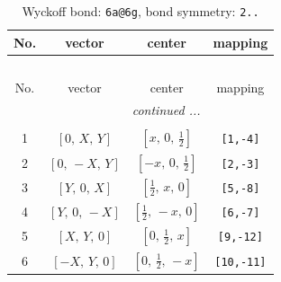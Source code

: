 \documentclass[fleqn,8pt]{jsarticle}
\begin{document}
\begin{longtable}{cccc}
\caption{Wyckoff bond: {\tt 6a@6g}, bond symmetry: {\tt 2..}}
 \\
 \hline \hline
No. & vector & center & mapping \\ \hline \endfirsthead

\multicolumn{3}{l}{\tablename\ \thetable{}} \\
 \hline \hline
No. & vector & center & mapping \\ \hline \endhead

 \hline \hline
\multicolumn{3}{r}{\footnotesize\it continued ...} \\ \endfoot

 \hline \hline
\multicolumn{3}{r}{} \\ \endlastfoot

1 & $\left[ 0,\, X,\, Y \right]$ & $\left[ x,\, 0,\, \frac{1}{2} \right]$ & {\tt [1,-4]} \\ \hline
2 & $\left[ 0,\, - X,\, Y \right]$ & $\left[ - x,\, 0,\, \frac{1}{2} \right]$ & {\tt [2,-3]} \\ \hline
3 & $\left[ Y,\, 0,\, X \right]$ & $\left[ \frac{1}{2},\, x,\, 0 \right]$ & {\tt [5,-8]} \\ \hline
4 & $\left[ Y,\, 0,\, - X \right]$ & $\left[ \frac{1}{2},\, - x,\, 0 \right]$ & {\tt [6,-7]} \\ \hline
5 & $\left[ X,\, Y,\, 0 \right]$ & $\left[ 0,\, \frac{1}{2},\, x \right]$ & {\tt [9,-12]} \\ \hline
6 & $\left[ - X,\, Y,\, 0 \right]$ & $\left[ 0,\, \frac{1}{2},\, - x \right]$ & {\tt [10,-11]} \\
\end{longtable}
\renewcommand{\arraystretch}{1.2}
\end{document}
